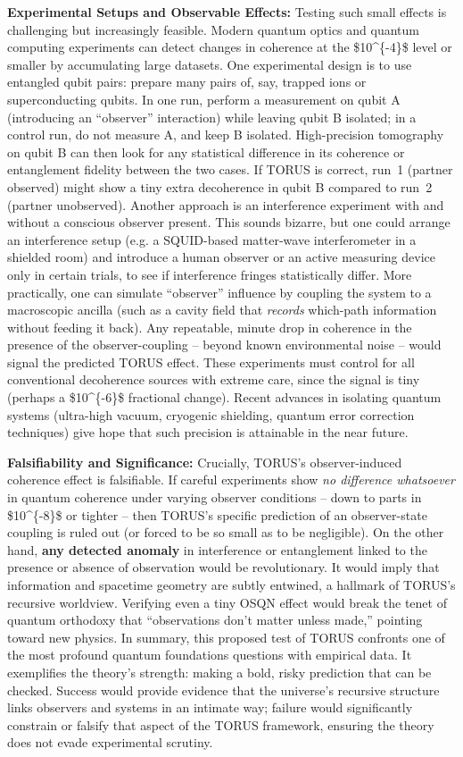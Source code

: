 \textbf{Experimental Setups and Observable Effects:} Testing such small
effects is challenging but increasingly feasible. Modern quantum optics
and quantum computing experiments can detect changes in coherence at the
\$10\^{}\{-4\}\$ level or smaller by accumulating large datasets. One
experimental design is to use entangled qubit pairs: prepare many pairs
of, say, trapped ions or superconducting qubits. In one run, perform a
measurement on qubit A (introducing an ``observer'' interaction) while
leaving qubit B isolated; in a control run, do not measure A, and keep B
isolated. High-precision tomography on qubit B can then look for any
statistical difference in its coherence or entanglement fidelity between
the two cases. If TORUS is correct, run~1 (partner observed) might show
a tiny extra decoherence in qubit B compared to run~2 (partner
unobserved​). Another approach is an interference experiment with and
without a conscious observer present. This sounds bizarre, but one could
arrange an interference setup (e.g. a SQUID-based matter-wave
interferometer in a shielded room) and introduce a human observer or an
active measuring device only in certain trials, to see if interference
fringes statistically differ​. More practically, one can simulate
``observer'' influence by coupling the system to a macroscopic ancilla
(such as a cavity field that \emph{records} which-path information
without feeding it back)​. Any repeatable, minute drop in coherence in
the presence of the observer-coupling -- beyond known environmental
noise -- would signal the predicted TORUS effect. These experiments must
control for all conventional decoherence sources with extreme care,
since the signal is tiny (perhaps a \$10\^{}\{-6\}\$ fractional
change​). Recent advances in isolating quantum systems (ultra-high
vacuum, cryogenic shielding, quantum error correction techniques) give
hope that such precision is attainable in the near future.

\textbf{Falsifiability and Significance:} Crucially, TORUS's
observer-induced coherence effect is falsifiable. If careful experiments
show \emph{no difference whatsoever} in quantum coherence under varying
observer conditions -- down to parts in \$10\^{}\{-8\}\$ or tighter --
then TORUS's specific prediction of an observer-state coupling is ruled
out (or forced to be so small as to be negligible)​. On the other hand,
\textbf{any detected anomaly} in interference or entanglement linked to
the presence or absence of observation would be revolutionary. It would
imply that information and spacetime geometry are subtly entwined, a
hallmark of TORUS's recursive worldview​. Verifying even a tiny OSQN
effect would break the tenet of quantum orthodoxy that ``observations
don't matter unless made,'' pointing toward new physics. In summary,
this proposed test of TORUS confronts one of the most profound quantum
foundations questions with empirical data. It exemplifies the theory's
strength: making a bold, risky prediction that can be checked. Success
would provide evidence that the universe's recursive structure links
observers and systems in an intimate way; failure would significantly
constrain or falsify that aspect of the TORUS framework, ensuring the
theory does not evade experimental scrutiny.

